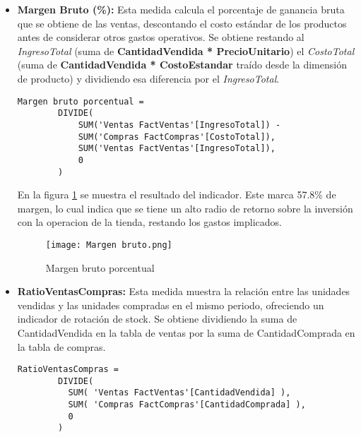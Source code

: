 \documentclass{article}
\begin{document}
\begin{itemize}
    \item \textbf{Margen Bruto (\%): } Esta medida calcula el porcentaje de ganancia bruta que se obtiene de las ventas, descontando el costo estándar de los productos antes de considerar otros gastos operativos.
Se obtiene restando al \emph{IngresoTotal} (suma de \textbf{CantidadVendida * PrecioUnitario}) el \emph{CostoTotal} (suma de \textbf{CantidadVendida * CostoEstandar} traído desde la dimensión de producto) y dividiendo esa diferencia por el \emph{IngresoTotal}.

    \begin{tcolorbox}[boxrule=0.3pt,sharp corners]
        \begin{lstlisting}[gobble=4]
        Margen bruto porcentual = 
        DIVIDE(
        	SUM('Ventas FactVentas'[IngresoTotal]) -
            SUM('Compras FactCompras'[CostoTotal]),
        	SUM('Ventas FactVentas'[IngresoTotal]),
            0
        )
        \end{lstlisting}
    \end{tcolorbox}

En la figura \ref{fig:margen-bruto-porcentual} se muestra el resultado del indicador. Este marca 57.8\% de margen, lo cual indica que se tiene un alto radio de retorno sobre la inversión con la operacion de la tienda, restando los gastos implicados.

\begin{figure}
    \centering
    \texttt{[image: Margen bruto.png]}
    \caption{Margen bruto porcentual}
    \label{fig:margen-bruto-porcentual}
\end{figure}
    
\end{itemize}

\begin{itemize}
    \item \textbf{RatioVentasCompras: } Esta medida muestra la relación entre las unidades vendidas y las unidades compradas en el mismo periodo, ofreciendo un indicador de rotación de stock.
Se obtiene dividiendo la suma de CantidadVendida en la tabla de ventas por la suma de CantidadComprada en la tabla de compras.

    \begin{tcolorbox}[boxrule=0.3pt,sharp corners]
        \begin{lstlisting}[gobble=4]
    RatioVentasCompras = 
        DIVIDE(
          SUM( 'Ventas FactVentas'[CantidadVendida] ),
          SUM( 'Compras FactCompras'[CantidadComprada] ),
          0
        )
        \end{lstlisting}
    \end{tcolorbox}

\end{itemize}
\end{document}
